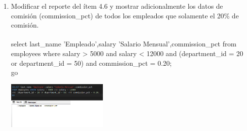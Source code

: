 \begin{enumerate}[1.]
	\item Modificar el reporte del ítem 4.6 y mostrar adicionalmente los datos de comisión (commission\_pct) de todos los empleados que solamente el 20\% de comisi\'on.
	\\ \\select last\_name 'Empleado',salary 'Salario Mensual',commission\_pct from employees where salary > 5000 and salary < 12000 and (department\_id = 20 or department\_id = 50) and commission\_pct = 0.20;
	\\go

	\begin{center}
	\includegraphics[width=5cm]{./Imagenes/actividad_04_15} 
	\end{center}

\end{enumerate}

